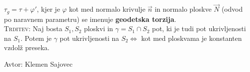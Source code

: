 \documentclass[8pt,a4paper]{amsart}
\theoremstyle{definition} %
\theoremstyle{plain} %
\begin{document}
$\tau_g = \tau + \varphi' $, kjer je $\varphi$ kot med normalo krivulje $\vec{n}$ in normalo ploskve $\vec{N}$ (odvod po naravnem parametru) se imenuje \textbf{geodetska torzija}.
\\

\textsc{Trditev: }Naj bosta $S_1,S_2$ ploskvi in $\gamma = S_1 \cap S_2$ pot, ki je tudi pot ukrivljenosti na $S_1$. Potem je $\gamma$ pot ukrivljenosti na $S_2 \Longleftrightarrow$ kot med ploskvama je konstanten vzdolž preseka.

\vfill \hfill Avtor: Klemen Sajovec
\end{document}
